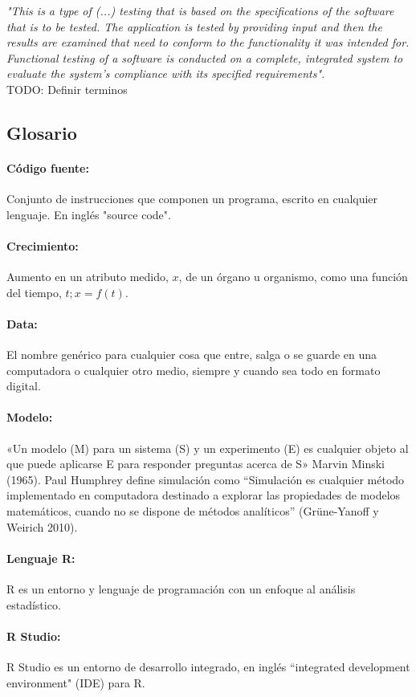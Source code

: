 \textit{"This is a type of (...) testing that is based on the specifications of the software that is to be tested. The application is tested by providing input and then the results are examined that need to conform to the functionality it was intended for. Functional testing of a software is conducted on a complete, integrated system to evaluate the system’s compliance with its specified requirements".}\\

TODO: Definir terminos\\

\subsection{Glosario}

\paragraph{Código fuente:} Conjunto de instrucciones que componen un programa, escrito en cualquier lenguaje. En inglés "source code".
\paragraph{Crecimiento:} Aumento en un atributo medido, $x$, de un \'organo u organismo, como una funci\'on del tiempo, $t;x = f (t)$.
\paragraph{Data:} El nombre genérico para cualquier cosa que entre, salga o se guarde en una computadora o cualquier otro medio, siempre y cuando sea todo en formato digital.
\paragraph{Modelo:} «Un modelo (M) para un sistema (S) y un experimento (E) es cualquier objeto al que puede aplicarse E para responder preguntas acerca de S» Marvin Minski (1965). Paul Humphrey define simulación como “Simulación es cualquier método implementado en computadora destinado a explorar las propiedades de modelos matemáticos, cuando no se dispone de métodos analíticos” (Grüne-Yanoff y Weirich 2010).
\paragraph{Lenguaje R:} R es un entorno y lenguaje de programaci\'on con un enfoque al an\'alisis estad\'istico.
\paragraph{R Studio:} R Studio es un entorno de desarrollo integrado, en ingl\'es ``integrated development environment" (IDE) para R.

